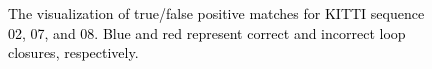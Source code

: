 \documentclass[letterpaper, 10 pt, conference]{ieeeconf}   %
\newcommand\kevin[1]{\textcolor{black}{#1}}
\begin{document}

\begin{figure}
	\centering
    \caption{\kevin{The visualization of true/false positive matches for KITTI sequence 02, 07, and 08. Blue and red represent correct and incorrect loop closures, respectively.}} 
	\label{T/FMatch}
\end{figure}
\end{document}
